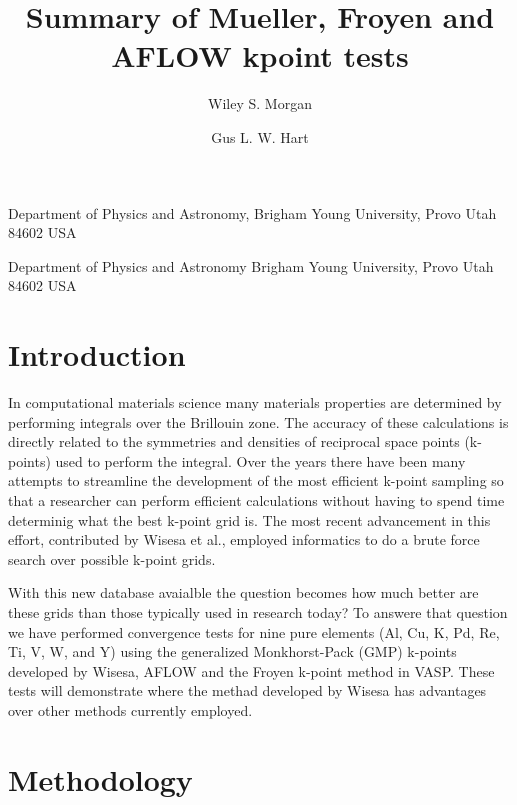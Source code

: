 \documentclass[12pt,prb,reprint]{revtex4-1}
\begin{document}
\title{Summary of Mueller, Froyen and AFLOW kpoint tests}

\author
{Wiley S. Morgan}
\affiliation
{Department of Physics and Astronomy, Brigham Young University, Provo Utah 84602 USA}

\author
{Gus L. W. Hart}
\affiliation
{Department of Physics and Astronomy Brigham Young University, Provo Utah 84602 USA}


\begin{abstract}

\end{abstract}

\maketitle

\section{Introduction} \label{Intro}

In computational materials science many materials properties are
determined by performing integrals over the Brillouin zone. The
accuracy of these calculations is directly related to the symmetries
and densities of reciprocal space points (k-points) used to perform
the integral. Over the years there have been many attempts to
streamline the development of the most efficient k-point sampling so
that a researcher can perform efficient calculations without having to
spend time determinig what the best k-point grid is. The most recent
advancement in this effort, contributed by Wisesa et al.\cite{Wisesa},
employed informatics to do a brute force search over possible k-point
grids.

With this new database avaialble the question becomes how much better
are these grids than those typically used in research today? To
answere that question we have performed convergence tests for nine
pure elements (Al, Cu, K, Pd, Re, Ti, V, W, and Y) using the
generalized Monkhorst-Pack (GMP) k-points developed by Wisesa,
AFLOW\cite{AFLOW} and the Froyen\cite{Froyen} k-point method in
VASP. These tests will demonstrate where the methad developed by
Wisesa has advantages over other methods currently employed.

\section{Methodology} \label{Method}
\end{document}
